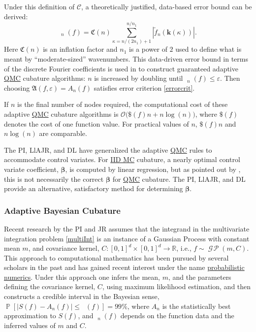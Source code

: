 \documentclass[11pt]{NSFamsart}
\newcommand{\QMC}{\hyperlink{QMClink}{QMC}\xspace}
\newcommand{\IIDMC}{\hyperlink{IIDMClink}{IID MC}\xspace}
\newcommand{\tf}{\widetilde{f}}
\DeclareMathOperator{\GP}{\mathcal{G} \! \mathcal{P}}
\newcommand{\reals}{{\mathbb{R}}}
\DeclareMathOperator{\err}{err}
\DeclareMathOperator{\herr}{\widehat{\err}}
\newcommand{\bk}{{\boldsymbol{k}}}
\newcommand{\bg}{{\boldsymbol{g}}}
\newcommand{\bbeta}{{\boldsymbol{\beta}}}
\newcommand{\cc}{\mathcal{C}}
\newcommand{\fA}{\mathfrak{A}}
\newcommand{\fC}{\mathfrak{C}}
\DeclareMathOperator{\Prob}{\mathbb{P}}
\def\abs#1{\ensuremath{\left \lvert #1 \right \rvert}}
\newcommand{\Order}{\mathcal{O}}
\begin{document}
Under this definition of $\cc$, a 
theoretically justified, data-based error bound can be derived:
\begin{equation*}
\herr_n(f) = \fC(n) \sum_{\kappa = n/(2n_1) + 1}^{n/n_1} \abs{\tf_n(\bk(\kappa))}.
\end{equation*}
Here $\fC(n)$ is an inflation factor and $n_1$ is a power of $2$ used to define what is meant by 
``moderate-sized'' wavenumbers.  This data-driven error bound in terms of the discrete Fourier 
coefficients is used in \cite{HicJim16a,JimHic16a} to construct guaranteed adaptive \QMC cubature 
algorithms: $n$ is increased by doubling until $\herr_n(f) \le \varepsilon$.  Then choosing 
$\fA(f,\varepsilon) = A_n(f)$ satisfies  error criterion 
\eqref{errorcrit}.  

If $n$ is the final number of nodes required, the computational cost of these adaptive \QMC 
cubature algorithms  is $\Order\bigl(\$(f)n + n \log(n)\bigr)$, 
where $\$(f)$ denotes the cost of one function value.  For practical values of $n$,  $\$(f)n$ and 
$n \log(n)$ are comparable.

The PI, LlAJR, and DL have generalized the adaptive \QMC rules to accommodate control variates.  
For \IIDMC cubature, a nearly optimal control variate coefficient, $\bbeta$, is 
computed by linear regression, but as pointed out by \cite{HicEtal03}, this is not necessarily the 
correct $\bbeta$ for \QMC cubature.  The PI, LlAJR, and DL provide an alternative, satisfactory 
method for 
determining $\bbeta$.

\subsubsection{Adaptive Bayesian Cubature}  \label{Bayessect} Recent research by the PI and 
JR assumes
that the integrand in the multivariate integration problem \eqref{multiInt} is an instance of a 
Gaussian 
Process with constant mean $m$, and covariance kernel, $C:[0,1]^d \times [0,1]^d \to \reals$, i.e., 
$f \sim \GP (m,C)$.  This approach to computational mathematics has been pursued by several 
scholars in the past \cite{Dia88a, OHa91a, RasGha03a, Rit00a} and has gained recent interest 
under the name \href{http://www.probabilistic-numerics.org}{probabilistic numerics}.  Under this 
approach one 
infers the mean, $m$, and the parameters defining the covariance kernel, $C$, using maximum 
likelihood estimation, and then constructs a credible interval in the Bayesian sense, $\Prob[\abs{S(f) 
- A_n(f)} \le \herr(f)] = 99\%$, where $A_n$ is the statistically best approximation to $S(f)$, and 
$\herr_n(f)$ depends on the function data and the inferred values of $m$ and $C$. 
\end{document}

